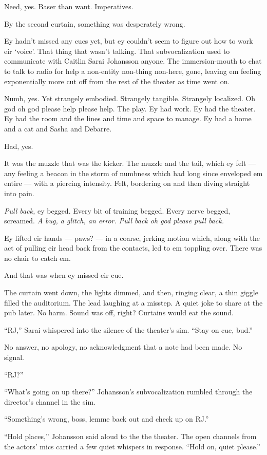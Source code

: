 Need, yes. Baser than want. Imperatives.

By the second curtain, something was desperately wrong.

Ey hadn't missed any cues yet, but ey couldn't seem to figure out how to work eir `voice'. That thing that wasn't talking. That subvocalization used to communicate with Caitlin Sarai Johansson anyone. The immersion-mouth to chat to talk to radio for help a non-entity non-thing non-here, gone, leaving em feeling exponentially more cut off from the rest of the theater as time went on.

Numb, yes. Yet strangely embodied. Strangely tangible. Strangely localized. Oh god oh god please help please help. The play. Ey had work. Ey had the theater. Ey had the room and the lines and time and space to manage. Ey had a home and a cat and Sasha and Debarre.

Had, yes.

It was the muzzle that was the kicker. The muzzle and the tail, which ey felt --- any feeling a beacon in the storm of numbness which had long since enveloped em entire --- with a piercing intensity. Felt, bordering on and then diving straight into pain.

\emph{Pull back,} ey begged. Every bit of training begged. Every nerve begged, screamed. \emph{A bug, a glitch, an error. Pull back oh god please pull back.}

Ey lifted eir hands --- paws? --- in a coarse, jerking motion which, along with the act of pulling eir head back from the contacts, led to em toppling over. There was no chair to catch em.

And that was when ey missed eir cue.

The curtain went down, the lights dimmed, and then, ringing clear, a thin giggle filled the auditorium. The lead laughing at a misstep. A quiet joke to share at the pub later. No harm. Sound was off, right? Curtains would eat the sound.

``RJ,'' Sarai whispered into the silence of the theater's sim. ``Stay on cue, bud.''

No answer, no apology, no acknowledgment that a note had been made. No signal.

``RJ?''

``What's going on up there?'' Johansson's subvocalization rumbled through the director's channel in the sim.

``Something's wrong, boss, lemme back out and check up on RJ.''

``Hold places,'' Johansson said aloud to the the theater. The open channels from the actors' mics carried a few quiet whispers in response. ``Hold on, quiet please.''

